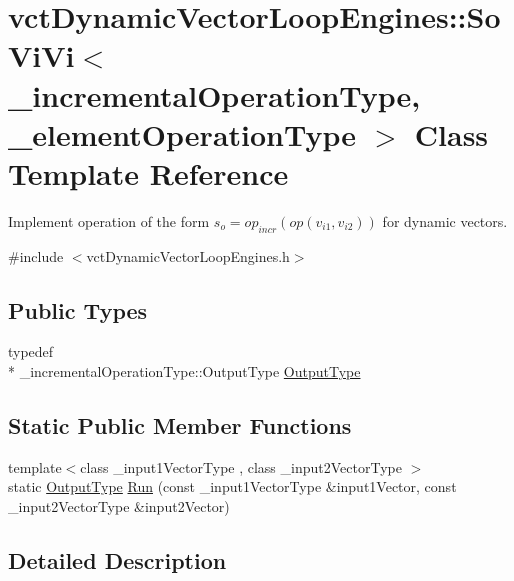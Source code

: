 \hypertarget{classvct_dynamic_vector_loop_engines_1_1_so_vi_vi}{\section{vct\-Dynamic\-Vector\-Loop\-Engines\-:\-:So\-Vi\-Vi$<$ \-\_\-incremental\-Operation\-Type, \-\_\-element\-Operation\-Type $>$ Class Template Reference}
\label{classvct_dynamic_vector_loop_engines_1_1_so_vi_vi}
}


Implement operation of the form $s_o = op_{incr}(op(v_{i1}, v_{i2}))$ for dynamic vectors.  




{\ttfamily \#include $<$vct\-Dynamic\-Vector\-Loop\-Engines.\-h$>$}

\subsection*{Public Types}
\begin{DoxyCompactItemize}
\item 
typedef \\*
\-\_\-incremental\-Operation\-Type\-::\-Output\-Type \hyperlink{classvct_dynamic_vector_loop_engines_1_1_so_vi_vi_af495d5a3b96441aefe55b21a9988d335}{Output\-Type}
\end{DoxyCompactItemize}
\subsection*{Static Public Member Functions}
\begin{DoxyCompactItemize}
\item 
{\footnotesize template$<$class \-\_\-input1\-Vector\-Type , class \-\_\-input2\-Vector\-Type $>$ }\\static \hyperlink{classvct_dynamic_vector_loop_engines_1_1_so_vi_vi_af495d5a3b96441aefe55b21a9988d335}{Output\-Type} \hyperlink{classvct_dynamic_vector_loop_engines_1_1_so_vi_vi_a541dc81fac40742aa4fff8f124c4c43e}{Run} (const \-\_\-input1\-Vector\-Type \&input1\-Vector, const \-\_\-input2\-Vector\-Type \&input2\-Vector)
\end{DoxyCompactItemize}


\subsection{Detailed Description}
